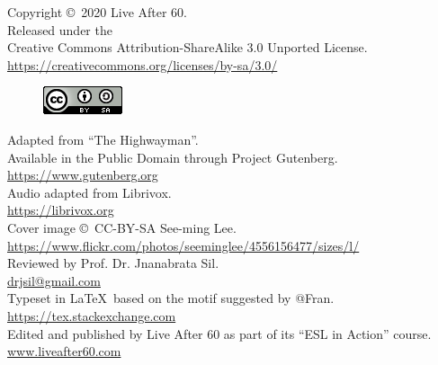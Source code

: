 \documentclass[oneside]{book}
\begin{document}
\newpage
\frontmatter
\vspace*{15ex}
\begin{center}
  Copyright \copyright\ 2020 Live After 60.\\
  Released under the \\
  Creative Commons Attribution-ShareAlike 3.0 Unported License.\\
  \href{https://creativecommons.org/licenses/by-sa/3.0/}{
    https://creativecommons.org/licenses/by-sa/3.0/}
  \begin{figure}[H]
    \centering
    \includegraphics[scale=0.8]{cc-by-sa}
  \end{figure}
  Adapted from ``The Highwayman''.\\ 
  Available in the Public Domain through Project Gutenberg.\\
  \href{https://www.gutenberg.org}{https://www.gutenberg.org}\\
  \bigskip
  Audio adapted from Librivox.\\
  \href{https://librivox.org}{https://librivox.org}\\
  \bigskip
  Cover image \copyright\ CC-BY-SA See-ming Lee.\\
  \href{https://www.flickr.com/photos/seeminglee/4556156477/sizes/l/}{https://www.flickr.com/photos/seeminglee/4556156477/sizes/l/}\\
  \bigskip
  Reviewed by Prof. Dr. Jnanabrata Sil.\\
  \href{drjsil@gmail.com}{drjsil@gmail.com} \\
  \bigskip
  Typeset in \LaTeX\ based on the motif suggested by @Fran. \\
  \href{https://tex.stackexchange.com}{https://tex.stackexchange.com} \\
  \bigskip
  Edited and published by Live After 60 as part of its ``ESL in Action''
	course.\\
  \href{http://www.liveafter60.com}{www.liveafter60.com}
\end{center}
\vspace*{15ex}
\end{document}
